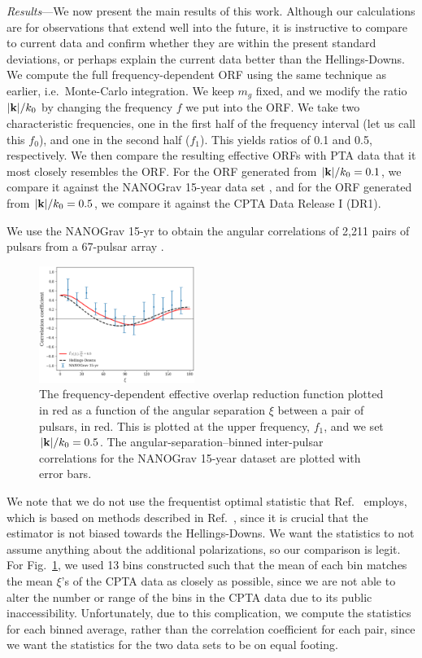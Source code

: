 \documentclass[prd,twocolumn,aps,psfig,nofootinbib,nobibnotes,superscriptaddress,preprintnumbers,times]{revtex4-2}
\begin{document}
\textit{Results}---We now present the main results of this work. Although our calculations are for observations that extend well into the future, it is instructive to compare to current data and confirm whether they are within the present standard deviations, or perhaps explain the current data better than the Hellings-Downs. We compute the full frequency-dependent ORF using the same technique as earlier, i.e.\ Monte-Carlo integration. We keep $m_g$ fixed, and we modify the ratio $|{\bf k}|/k_0$ by changing the frequency $f$ we put into the ORF. We take two characteristic frequencies, one in the first half of the frequency interval (let us call this $f_0$), and one in the second half ($f_1$). This yields ratios of 0.1 and 0.5, respectively. We then compare the resulting effective ORFs with PTA data that it most closely resembles the ORF. For the ORF generated from $|{\bf k}|/k_0 = 0.1$, we compare it against the NANOGrav 15-year data set \cite{Agazie:2023}, and for the ORF generated from $|{\bf k}|/k_0 = 0.5$, we compare it against the CPTA Data Release I (DR1).

We use the NANOGrav 15-yr to obtain the angular correlations of 2,211 pairs of pulsars from a 67-pulsar array \cite{Agazie:2023}. 
\begin{figure}[h]
    \centering
    \includegraphics[width=0.45\textwidth]{fig2.pdf}
    \caption{The frequency-dependent effective overlap reduction function plotted in red as a function of the angular separation $\xi$ between a pair of pulsars, in red. This is plotted at the upper frequency, $f_1$, and we set $|{\bf k}|/k_0 = 0.5$. The angular-separation–binned inter-pulsar correlations for the NANOGrav 15-year dataset are plotted with error bars.}
    \label{fig:ng}
\end{figure}
We note that we do not use the frequentist optimal statistic that Ref.\ \cite{Agazie:2023} employs, which is based on methods described in Ref.\ \cite{Allen:2022ksj}, since it is crucial that the estimator is not biased towards the Hellings-Downs. We want the statistics to not assume anything about the additional polarizations, so our comparison is legit. For Fig.\ \ref{fig:ng}, we used 13 bins constructed such that the mean of each bin matches the mean $\xi$'s of the CPTA data as closely as possible, since we are not able to alter the number or range of the bins in the CPTA data due to its public inaccessibility. Unfortunately, due to this complication, we compute the statistics for each binned average, rather than the correlation coefficient for each pair, since we want the statistics for the two data sets to be on equal footing. 
\end{document}
